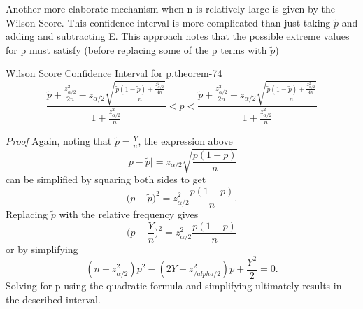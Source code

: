 \documentclass[10pt,]{book}
\makeatletter
\renewcommand*{\proofname}{Proof}
\renewenvironment{proof}[1][\proofname]{\par
  \pushQED{\qed}%
  \normalfont \topsep6\p@\@plus6\p@\relax
  \trivlist
  \item\relax
    {\itshape
    #1\@addpunct{.}}\hspace\labelsep\ignorespaces
}{%
  \popQED\endtrivlist\@endpefalse
}
\numberwithin{equation}{section}
\newcommand{\lt}{<}
\makeatother
\begin{document}
\par
\hypertarget{p-1281}{}%
Another more elaborate mechanism when n is relatively large is given by the Wilson Score. This confidence interval is more complicated than just taking \(\tilde{p}\) and adding and subtracting E. This approach notes that the possible extreme values for p must satisfy (before replacing some of the p terms with \(\tilde{p}\))%
\par
\hypertarget{p-1282}{}%
\begin{theorem}{Wilson Score Confidence Interval for p.}{}{theorem-74}%
\hypertarget{p-1283}{}%
%
\begin{equation*}
\frac{\tilde{p} + \frac{z_{\alpha/2}^2}{2n} - z_{\alpha/2} \sqrt{\frac{\tilde{p}(1-\tilde{p}) + \frac{z_{\alpha/2}^2}{4n}}{n}}}{1 + \frac{z_{\alpha/2}^2}{n}} \lt p \lt \frac{\tilde{p} + \frac{z_{\alpha/2}^2}{2n} + z_{\alpha/2} \sqrt{\frac{\tilde{p}(1-\tilde{p}) + \frac{z_{\alpha/2}^2}{4n}}{n}}}{1 + \frac{z_{\alpha/2}^2}{n}}
\end{equation*}
%
\end{theorem}
\begin{proof}\hypertarget{proof-72}{}
\hypertarget{p-1284}{}%
Again, noting that \(\tilde{p} = \frac{Y}{n}\), the expression above%
\begin{equation*}
\big | p - \tilde{p} \big | = z_{\alpha /2} \sqrt{\frac{p(1-p)}{n}}
\end{equation*}
can be simplified by squaring both sides to get%
\begin{equation*}
\big ( p - \tilde{p} \big )^2 = z_{\alpha /2}^2 \frac{p(1-p)}{n}.
\end{equation*}
Replacing \(\tilde{p}\) with the relative frequency gives%
\begin{equation*}
\big ( p - \frac{Y}{n} \big )^2 = z_{\alpha /2}^2 \frac{p(1-p)}{n}
\end{equation*}
or by simplifying%
\begin{equation*}
(n+z_{\alpha /2}^2 )p^2 - (2Y+z_{/alpha /2}^2) p + \frac{Y^2}{2} = 0.
\end{equation*}
Solving for p using the quadratic formula and simplifying ultimately results in the described interval.%
\end{proof}
\end{document}
